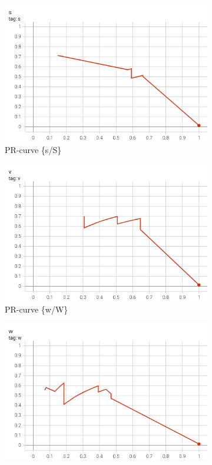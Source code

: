 \begin{figure}[htbp]
    \centering
    \begin{subfigure}[t]{0.32\textwidth}
        \centering
        \includegraphics[width=\textwidth]{images/pr_curve_conf1.png}
        \caption{PR-curve \{s/S\}}
    \end{subfigure}
    \begin{subfigure}[t]{0.32\textwidth}
        \centering
        \includegraphics[width=\textwidth]{images/pr_curve_conf2.png}
        \caption{PR-curve \{w/W\}}
    \end{subfigure}
    \begin{subfigure}[t]{0.32\textwidth}
        \centering
        \includegraphics[width=\textwidth]{images/pr_curve_conf3.png}

\end{subfigure}
\end{figure}
